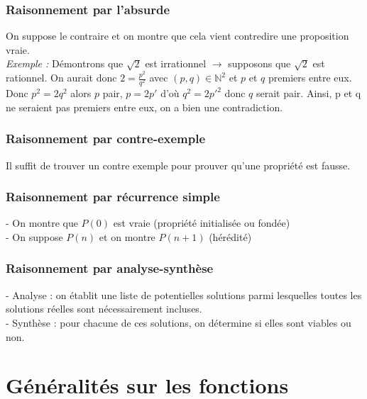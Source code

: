 \begin{multicols}{2}
      \subsection{Raisonnement par l'absurde}\label{subsec:raisonnement-par-l'absurde}

        On suppose le contraire et on montre que cela vient contredire une proposition vraie.\\
        \textit{Exemple :} Démontrons que $\sqrt{2}$ est irrationnel $\rightarrow$ supposons que $\sqrt{2}$ est rationnel.
        On aurait donc $2 = \frac{p^2}{q^2}$ avec $(p, q) \in \mathbb{N}^2$ et $p$ et $q$ premiers entre eux.
        Donc $p^2 = 2q^2$ alors $p$ pair, $p = 2p'$ d'où $q^2 = 2p'^2$ donc $q$ serait pair.
        Ainsi, p et q ne seraient pas premiers entre eux, on a bien une contradiction.

      \subsection{Raisonnement par contre-exemple}\label{subsec:raisonnement-par-contre-exemple}

        Il suffit de trouver un contre exemple pour prouver qu'une propriété est fausse.

      \subsection{Raisonnement par récurrence simple}\label{subsec:raisonnement-par-recurrence}

        - On montre que $P(0)$ est vraie (propriété initialisée ou fondée)\\
        - On suppose $P(n)$ et on montre $P(n+1)$ (hérédité)

      \subsection{Raisonnement par analyse-synthèse}\label{subsec:raisonnement-par-analyse-synthese}

        - Analyse : on établit une liste de potentielles solutions parmi lesquelles toutes les solutions réelles sont nécessairement incluses.\\
        - Synthèse : pour chacune de ces solutions,  on détermine si elles sont viables ou non.

    \end{multicols}

\clearpage
\chapter{Généralités sur les fonctions}\label{ch:generalites-sur-les-fonctions}



